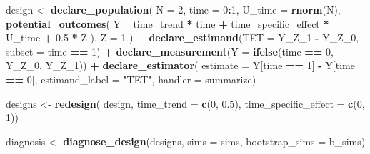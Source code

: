 \documentclass[
]{article}
\newenvironment{Shaded}{\begin{snugshade}}{\end{snugshade}}
\newcommand{\DataTypeTok}[1]{\textcolor[rgb]{0.13,0.29,0.53}{#1}}
\newcommand{\DecValTok}[1]{\textcolor[rgb]{0.00,0.00,0.81}{#1}}
\newcommand{\FloatTok}[1]{\textcolor[rgb]{0.00,0.00,0.81}{#1}}
\newcommand{\KeywordTok}[1]{\textcolor[rgb]{0.13,0.29,0.53}{\textbf{#1}}}
\newcommand{\NormalTok}[1]{#1}
\newcommand{\OperatorTok}[1]{\textcolor[rgb]{0.81,0.36,0.00}{\textbf{#1}}}
\newcommand{\StringTok}[1]{\textcolor[rgb]{0.31,0.60,0.02}{#1}}
\begin{document}
\begin{Shaded}
\begin{Highlighting}[]
\NormalTok{design <-}\StringTok{ }
\StringTok{  }\KeywordTok{declare_population}\NormalTok{(}
    \DataTypeTok{N =} \DecValTok{2}\NormalTok{, }
    \DataTypeTok{time =} \DecValTok{0}\OperatorTok{:}\DecValTok{1}\NormalTok{,}
    \DataTypeTok{U_time =} \KeywordTok{rnorm}\NormalTok{(N),}
    \KeywordTok{potential_outcomes}\NormalTok{(}
\NormalTok{      Y }\OperatorTok{~}\StringTok{ }\NormalTok{time_trend }\OperatorTok{*}\StringTok{ }\NormalTok{time }\OperatorTok{+}\StringTok{ }\NormalTok{time_specific_effect }\OperatorTok{*}\StringTok{ }\NormalTok{U_time }\OperatorTok{+}\StringTok{ }\FloatTok{0.5} \OperatorTok{*}\StringTok{ }\NormalTok{Z}
\NormalTok{    ),}
    \DataTypeTok{Z =} \DecValTok{1}
\NormalTok{  ) }\OperatorTok{+}\StringTok{ }
\StringTok{  }\KeywordTok{declare_estimand}\NormalTok{(}\DataTypeTok{TET =}\NormalTok{ Y_Z_}\DecValTok{1} \OperatorTok{-}\StringTok{ }\NormalTok{Y_Z_}\DecValTok{0}\NormalTok{, }\DataTypeTok{subset =}\NormalTok{ time }\OperatorTok{==}\StringTok{ }\DecValTok{1}\NormalTok{) }\OperatorTok{+}\StringTok{ }
\StringTok{  }\KeywordTok{declare_measurement}\NormalTok{(}\DataTypeTok{Y =} \KeywordTok{ifelse}\NormalTok{(time }\OperatorTok{==}\StringTok{ }\DecValTok{0}\NormalTok{, Y_Z_}\DecValTok{0}\NormalTok{, Y_Z_}\DecValTok{1}\NormalTok{)) }\OperatorTok{+}\StringTok{ }
\StringTok{  }\KeywordTok{declare_estimator}\NormalTok{(}
    \DataTypeTok{estimate =}\NormalTok{ Y[time }\OperatorTok{==}\StringTok{ }\DecValTok{1}\NormalTok{] }\OperatorTok{-}\StringTok{ }\NormalTok{Y[time }\OperatorTok{==}\StringTok{ }\DecValTok{0}\NormalTok{], }
    \DataTypeTok{estimand_label =} \StringTok{"TET"}\NormalTok{, }\DataTypeTok{handler =}\NormalTok{ summarize)}

\NormalTok{designs <-}\StringTok{ }\KeywordTok{redesign}\NormalTok{(}
\NormalTok{  design, }\DataTypeTok{time_trend =} \KeywordTok{c}\NormalTok{(}\DecValTok{0}\NormalTok{, }\FloatTok{0.5}\NormalTok{), }\DataTypeTok{time_specific_effect =} \KeywordTok{c}\NormalTok{(}\DecValTok{0}\NormalTok{, }\DecValTok{1}\NormalTok{))}
\end{Highlighting}
\end{Shaded}

\begin{Shaded}
\begin{Highlighting}[]
\NormalTok{diagnosis <-}\StringTok{ }\KeywordTok{diagnose_design}\NormalTok{(designs, }\DataTypeTok{sims =}\NormalTok{ sims, }\DataTypeTok{bootstrap_sims =}\NormalTok{ b_sims)}
\end{Highlighting}
\end{Shaded}
\end{document}
